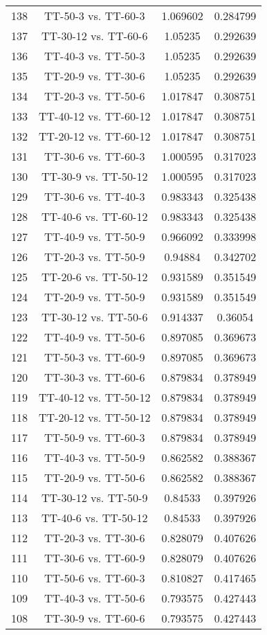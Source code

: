 \documentclass[a4paper,10pt]{article}
\begin{document}
\begin{landscape}
\begin{table}[!htp]
\begin{tabular}{cccc}
138&TT-50-3 vs. TT-60-3&1.069602&0.284799\\
137&TT-30-12 vs. TT-60-6&1.05235&0.292639\\
136&TT-40-3 vs. TT-50-3&1.05235&0.292639\\
135&TT-20-9 vs. TT-30-6&1.05235&0.292639\\
134&TT-20-3 vs. TT-50-6&1.017847&0.308751\\
133&TT-40-12 vs. TT-60-12&1.017847&0.308751\\
132&TT-20-12 vs. TT-60-12&1.017847&0.308751\\
131&TT-30-6 vs. TT-60-3&1.000595&0.317023\\
130&TT-30-9 vs. TT-50-12&1.000595&0.317023\\
129&TT-30-6 vs. TT-40-3&0.983343&0.325438\\
128&TT-40-6 vs. TT-60-12&0.983343&0.325438\\
127&TT-40-9 vs. TT-50-9&0.966092&0.333998\\
126&TT-20-3 vs. TT-50-9&0.94884&0.342702\\
125&TT-20-6 vs. TT-50-12&0.931589&0.351549\\
124&TT-20-9 vs. TT-50-9&0.931589&0.351549\\
123&TT-30-12 vs. TT-50-6&0.914337&0.36054\\
122&TT-40-9 vs. TT-50-6&0.897085&0.369673\\
121&TT-50-3 vs. TT-60-9&0.897085&0.369673\\
120&TT-30-3 vs. TT-60-6&0.879834&0.378949\\
119&TT-40-12 vs. TT-50-12&0.879834&0.378949\\
118&TT-20-12 vs. TT-50-12&0.879834&0.378949\\
117&TT-50-9 vs. TT-60-3&0.879834&0.378949\\
116&TT-40-3 vs. TT-50-9&0.862582&0.388367\\
115&TT-20-9 vs. TT-50-6&0.862582&0.388367\\
114&TT-30-12 vs. TT-50-9&0.84533&0.397926\\
113&TT-40-6 vs. TT-50-12&0.84533&0.397926\\
112&TT-20-3 vs. TT-30-6&0.828079&0.407626\\
111&TT-30-6 vs. TT-60-9&0.828079&0.407626\\
110&TT-50-6 vs. TT-60-3&0.810827&0.417465\\
109&TT-40-3 vs. TT-50-6&0.793575&0.427443\\
108&TT-30-9 vs. TT-60-6&0.793575&0.427443\\

\end{tabular}
\end{table}
\end{landscape}
\end{document}
